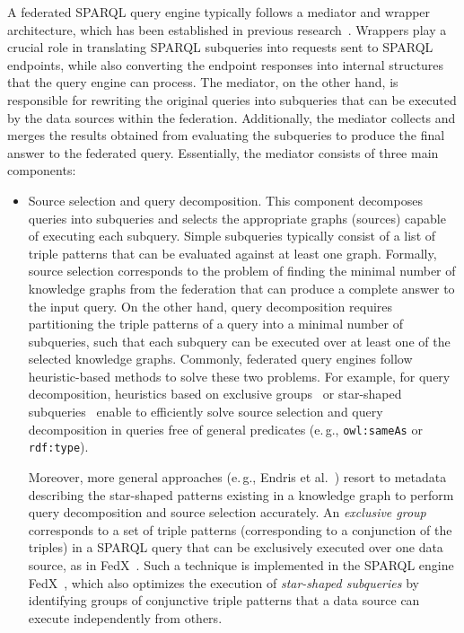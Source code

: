 \documentclass[a4paper,USenglish]{tgdk-v2021}
\begin{document}
A federated SPARQL query engine typically follows a mediator and wrapper architecture, which has been established in previous research~\cite{Wiederhold92,ZadorozhnyRVUB02}.
Wrappers play a crucial role in translating SPARQL subqueries into requests sent to SPARQL endpoints, while also converting the endpoint responses into internal structures that the query engine can process.
The mediator, on the other hand, is responsible for rewriting the original queries into subqueries that can be executed by the data sources within the federation.
Additionally, the mediator collects and merges the results obtained from evaluating the subqueries to produce the final answer to the federated query.
Essentially, the mediator consists of three main components:
\begin{itemize}
  \item Source selection and query decomposition.
    This component decomposes queries into subqueries and selects the appropriate graphs (sources) capable of executing each subquery.
    Simple subqueries typically consist of a list of triple patterns that can be evaluated against at least one graph.
    Formally, source selection corresponds to the problem of finding the minimal number of knowledge graphs from the federation that can produce a complete answer to the input query.
    On the other hand, query decomposition requires partitioning the triple patterns of a query into a minimal number of subqueries, such that each subquery can be executed over at least one of the selected knowledge graphs.
    Commonly, federated query engines follow heuristic-based methods to solve these two problems.
    For example, for query decomposition, heuristics based on exclusive groups~\cite{DBLP:conf/semweb/SchwarteHHSS11} or star-shaped subqueries~\cite{DBLP:conf/esws/VidalRLMSP10,DBLP:journals/tlsdkcs/VidalCAMP16,DBLP:conf/semweb/MontoyaSH17} enable to efficiently solve source selection and query decomposition in queries free of general predicates (e.\,g., \texttt{owl:sameAs} or \texttt{rdf:type}).

Moreover, more general approaches (e.\,g., Endris et al.~\cite{DBLP:journals/tlsdkcs/EndrisGLMVA18}) resort to metadata describing the star-shaped patterns existing in a knowledge graph to perform query decomposition and source selection accurately.
An \emph{exclusive group} corresponds to a set of triple patterns (corresponding to a conjunction of the triples) in a SPARQL query that can be exclusively executed over one data source, as in FedX~\cite{DBLP:conf/semweb/SchwarteHHSS11}. 
Such a technique is implemented in the SPARQL engine FedX~\cite{DBLP:conf/semweb/SchwarteHHSS11}, which also optimizes the execution of \emph{star-shaped subqueries} by identifying groups of conjunctive triple patterns that a data source can execute independently from others.


\end{itemize}
\end{document}
